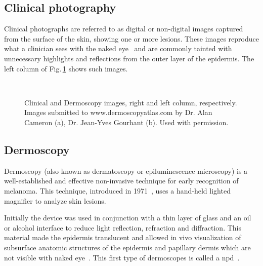 \subsection{Clinical photography}
Clinical photographs are referred to as digital or non-digital images captured from the surface of the skin, showing one or more lesions. 
These images reproduce what a clinician sees with the naked eye~\cite{day2000automated} and are commonly tainted with unnecessary highlights and reflections from the outer layer of the epidermis. 
The left column of Fig.\,\ref{fig:fig2} shows such images. 
\begin{figure}\centering
{}\\
	\caption[Clinical and dermoscopy images]{Clinical and Dermoscopy images, right and left column, respectively. Images submitted
to www.dermoscopyatlas.com by Dr. Alan Cameron (a), Dr. Jean-Yves Gourhant (b). Used with permission.}
\label{fig:fig2}
\end{figure}

\subsection{Dermoscopy}
\label{subsec:derm}
Dermoscopy (also known as dermatoscopy or epiluminescence microscopy) is a well-established and effective non-invasive technique for early recognition of melanoma. 
This technique, introduced in 1971~\cite{mackie1972cutaneous, mackie1971aid}, uses a hand-held lighted magnifier to analyze skin lesions. 

Initially the device was used in conjunction with a thin layer of glass and an oil or alcohol interface to reduce light reflection, refraction and diffraction.
This material made the epidermis translucent and allowed in vivo visualization of subsurface anatomic structures of the epidermis and papillary dermis which are not visible with naked eye~\cite{rigel2010evolution,wang2010noninvasive}.
This first type of dermoscopes is called a \ac{npd}~\cite{wang2010noninvasive}. 

